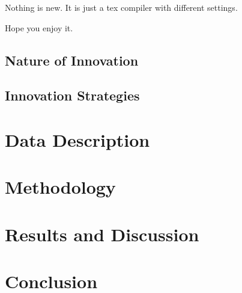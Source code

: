 \documentclass[12pt]{article}
\theoremstyle{definition}
\numberwithin{equation}{section}
\begin{document}
Nothing is new.  It is just a tex compiler with different settings. 

Hope you enjoy it. 


\subsection{Nature of Innovation}

\subsection{Innovation Strategies}

\section{Data Description}



\section{Methodology}


\section{Results and Discussion}

\section{Conclusion}






\newpage


\end{document}
